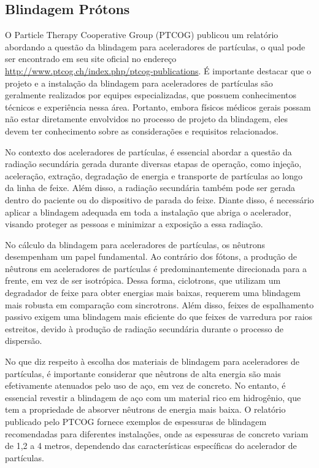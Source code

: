 \documentclass[11pt,a4paper]{article}
\newcounter{exemplo}
\begin{document}
\subsection*{Blindagem Prótons}

	O Particle Therapy Cooperative Group (PTCOG) publicou um relatório abordando a questão da blindagem para aceleradores de partículas, o qual pode ser encontrado em seu site oficial no endereço \href{http://www.ptcog.ch/index.php/ptcog-publications}{http://www.ptcog.ch/index.php/ptcog-publications}. É importante destacar que o projeto e a instalação da blindagem para aceleradores de partículas são geralmente realizados por equipes especializadas, que possuem conhecimentos técnicos e experiência nessa área. Portanto, embora físicos médicos gerais possam não estar diretamente envolvidos no processo de projeto da blindagem, eles devem ter conhecimento sobre as considerações e requisitos relacionados.

	No contexto dos aceleradores de partículas, é essencial abordar a questão da radiação secundária gerada durante diversas etapas de operação, como injeção, aceleração, extração, degradação de energia e transporte de partículas ao longo da linha de feixe. Além disso, a radiação secundária também pode ser gerada dentro do paciente ou do dispositivo de parada do feixe. Diante disso, é necessário aplicar a blindagem adequada em toda a instalação que abriga o acelerador, visando proteger as pessoas e minimizar a exposição a essa radiação.

	No cálculo da blindagem para aceleradores de partículas, os nêutrons desempenham um papel fundamental. Ao contrário dos fótons, a produção de nêutrons em aceleradores de partículas é predominantemente direcionada para a frente, em vez de ser isotrópica. Dessa forma, ciclotrons, que utilizam um degradador de feixe para obter energias mais baixas, requerem uma blindagem mais robusta em comparação com sincrotrons. Além disso, feixes de espalhamento passivo exigem uma blindagem mais eficiente do que feixes de varredura por raios estreitos, devido à produção de radiação secundária durante o processo de dispersão.

	No que diz respeito à escolha dos materiais de blindagem para aceleradores de partículas, é importante considerar que nêutrons de alta energia são mais efetivamente atenuados pelo uso de aço, em vez de concreto. No entanto, é essencial revestir a blindagem de aço com um material rico em hidrogênio, que tem a propriedade de absorver nêutrons de energia mais baixa. O relatório publicado pelo PTCOG fornece exemplos de espessuras de blindagem recomendadas para diferentes instalações, onde as espessuras de concreto variam de 1,2 a 4 metros, dependendo das características específicas do acelerador de partículas.
\end{document}
